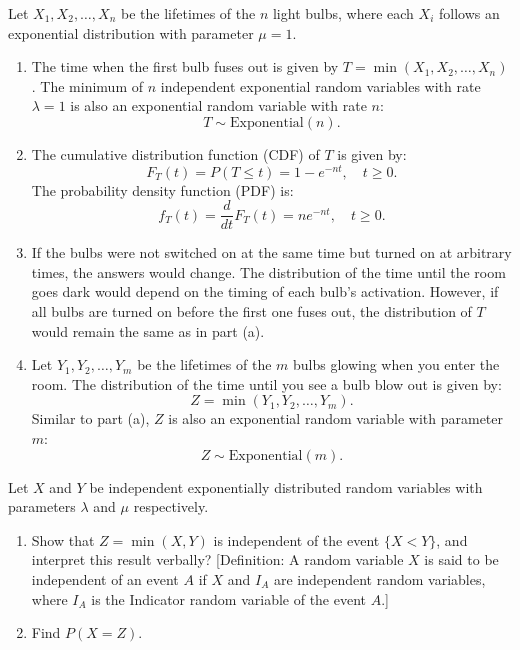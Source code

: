 \begin{solution}
    Let \( X_1, X_2, \ldots, X_n \) be the lifetimes of the \( n \) light bulbs, where each \( X_i \) follows an exponential distribution with parameter \( \mu = 1 \). 

    \begin{enumerate}[label=(\alph*)]
        \item The time when the first bulb fuses out is given by \( T = \min(X_1, X_2, \ldots, X_n) \). The minimum of \( n \) independent exponential random variables with rate \( \lambda = 1 \) is also an exponential random variable with rate \( n \):
        \[
        T \sim \text{Exponential}(n).
        \]

        \item The cumulative distribution function (CDF) of \( T \) is given by:
        \[
        F_T(t) = P(T \leq t) = 1 - e^{-nt}, \quad t \geq 0.
        \]
        The probability density function (PDF) is:
        \[
        f_T(t) = \frac{d}{dt} F_T(t) = n e^{-nt}, \quad t \geq 0.
        \]

        \item If the bulbs were not switched on at the same time but turned on at arbitrary times, the answers would change. The distribution of the time until the room goes dark would depend on the timing of each bulb's activation. However, if all bulbs are turned on before the first one fuses out, the distribution of \( T \) would remain the same as in part (a).

        \item Let \( Y_1, Y_2, \ldots, Y_m \) be the lifetimes of the \( m \) bulbs glowing when you enter the room. The distribution of the time until you see a bulb blow out is given by:
        \[
        Z = \min(Y_1, Y_2, \ldots, Y_m).
        \]
        Similar to part (a), \( Z \) is also an exponential random variable with parameter \( m \):
        \[
        Z \sim \text{Exponential}(m).
        \]
    \end{enumerate}
\end{solution}

\begin{exercise}
Let \( X \) and \( Y \) be independent exponentially distributed random variables with parameters \( \lambda \) and \( \mu \) respectively. 
\begin{enumerate}[label=(\alph*)]
    \item Show that \( Z = \min(X, Y) \) is independent of the event \( \{X < Y\} \), and interpret this result verbally? [Definition: A random variable \( X \) is said to be independent of an event \( A \) if \( X \) and \( I_A \) are independent random variables, where \( I_A \) is the Indicator random variable of the event \( A \).]
    \item Find \( P(X = Z) \).
\end{enumerate}
\end{exercise}


